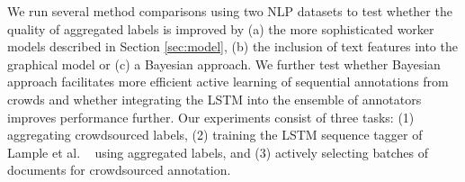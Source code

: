 %

We run several method comparisons using two NLP datasets to test whether the quality of aggregated labels is 
improved by (a) the more sophisticated worker models described in Section \ref{sec:model},
(b) the inclusion of text features into the graphical model or (c) a Bayesian approach. 
We further test whether Bayesian approach facilitates more efficient active learning of sequential annotations from crowds and whether integrating the LSTM into the ensemble of annotators improves performance further.
Our experiments consist of three tasks: (1) aggregating crowdsourced labels, (2) training the LSTM sequence tagger of Lample et al. ~ using aggregated labels, and (3) actively selecting batches of documents for crowdsourced annotation.
 

